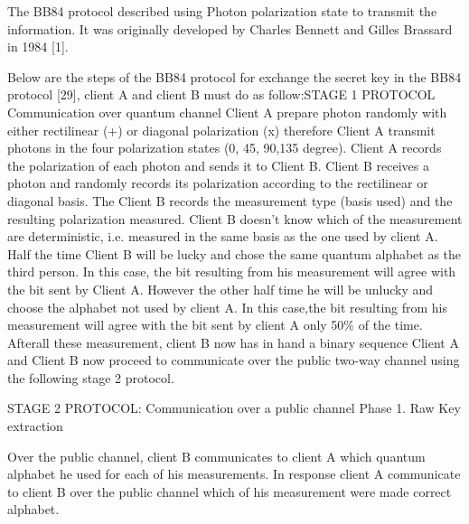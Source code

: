 The BB84 protocol described using Photon polarization state to transmit the information. It was originally developed by Charles Bennett and Gilles Brassard in 1984 [1].

Below are the steps of the BB84 protocol for exchange the secret key in the BB84 protocol [29], client A and client B must do as follow:STAGE 1 PROTOCOL Communication over quantum channel
Client A prepare photon randomly with either rectilinear (+) or diagonal polarization (x) therefore Client A transmit photons in the four polarization states (0, 45, 90,135 degree).
Client A records the polarization of each photon and sends it to Client B.
Client B receives a photon and randomly records its polarization according to the rectilinear or diagonal basis. The Client B records the measurement type (basis used) and the resulting polarization measured.
Client B doesn't know which of the measurement are deterministic, i.e. measured in the same basis as the one used by client A. Half the time Client B will be lucky and chose the same quantum alphabet as the third person. In this case, the bit resulting from his measurement will agree with the bit sent by Client A. However the other half time he will be unlucky and choose the alphabet not used by client A. In this case,the bit resulting from his measurement will agree with the bit sent by client A only 50\% of the time. Afterall these measurement, client B now has in hand a binary sequence 
Client A and Client B now proceed to communicate over the public two-way channel using the following stage 2 protocol.

STAGE 2 PROTOCOL: Communication over a public channel
Phase 1. Raw Key extraction

Over the public channel, client B communicates to client A which quantum alphabet he used for each of his measurements.
In response client A communicate to client B over the public channel which of his measurement were made correct alphabet.

